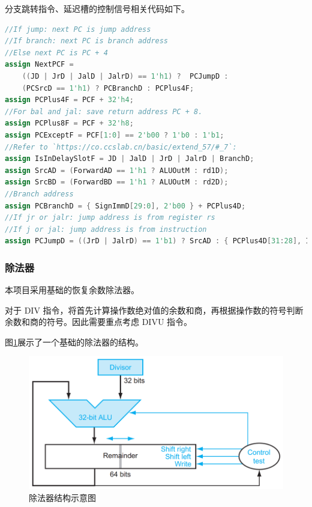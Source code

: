 分支跳转指令、延迟槽的控制信号相关代码如下。

\begin{lstlisting}[language=Verilog]
//If jump: next PC is jump address
//If branch: next PC is branch address
//Else next PC is PC + 4
assign NextPCF =
    ((JD | JrD | JalD | JalrD) == 1'h1) ?  PCJumpD :
    (PCSrcD == 1'h1) ? PCBranchD : PCPlus4F;
assign PCPlus4F = PCF + 32'h4;
//For bal and jal: save return address PC + 8.
assign PCPlus8F = PCF + 32'h8;
assign PCExceptF = PCF[1:0] == 2'b00 ? 1'b0 : 1'b1;
//Refer to `https://co.ccslab.cn/basic/extend_57/#_7`:
assign IsInDelaySlotF = JD | JalD | JrD | JalrD | BranchD;
assign SrcAD = (ForwardAD == 1'h1 ? ALUOutM : rd1D);
assign SrcBD = (ForwardBD == 1'h1 ? ALUOutM : rd2D);
//Branch address
assign PCBranchD = { SignImmD[29:0], 2'b00 } + PCPlus4D;
//If jr or jalr: jump address is from register rs
//If j or jal: jump address is from instruction
assign PCJumpD = ((JrD | JalrD) == 1'b1) ? SrcAD : { PCPlus4D[31:28], InstrD[25:0], 2'h0 };
\end{lstlisting}

\subsubsection{除法器}

本项目采用基础的恢复余数除法器\cite{computer-organization-and-design}。

对于 DIV 指令，将首先计算操作数绝对值的余数和商，再根据操作数的符号判断余数和商的符号。因此需要重点考虑 DIVU 指令。

图\ref{fig:除法器结构}展示了一个基础的除法器的结构。

\begin{figure}[H]
    \centering
    \includegraphics[width=1\linewidth]{image/除法器结构.png}
    \caption{除法器结构示意图}
    \label{fig:除法器结构}
\end{figure}

